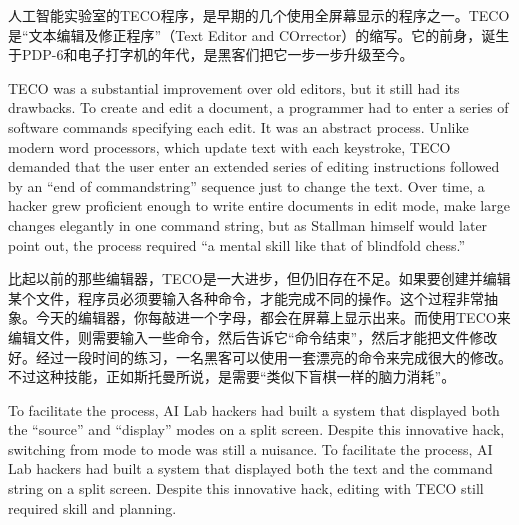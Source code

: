 \ifdefined\chs
人工智能实验室的TECO程序，是早期的几个使用全屏幕显示的程序之一。TECO是``文本编辑及修正程序''（Text Editor and COrrector）的缩写。它的前身，诞生于PDP-6和电子打字机的年代，是黑客们把它一步一步升级至今。
\fi

\ifdefined\eng
TECO was a substantial improvement over old editors, but it still had its drawbacks. To create and edit a document, a programmer had to enter a series of \ifdefined\vone software \fi commands specifying each edit. It was an abstract process. Unlike modern word processors, which update text with each keystroke, TECO demanded that the user enter an extended series of editing instructions followed by an ``end of command\ifdefined\vtwo string\fi'' sequence just to change the text. Over time, a hacker grew proficient enough to \ifdefined\vone write entire documents in edit mode, \fi\ifdefined\vtwo make large changes elegantly in one command string, \fi but as Stallman himself would later point out, the process required ``a mental skill like that of blindfold chess.''
\fi

\ifdefined\chs
比起以前的那些编辑器，TECO是一大进步，但仍旧存在不足。如果要创建并编辑某个文件，程序员必须要输入各种命令，才能完成不同的操作。这个过程非常抽象。今天的编辑器，你每敲进一个字母，都会在屏幕上显示出来。而使用TECO来编辑文件，则需要输入一些命令，然后告诉它``命令结束''，然后才能把文件修改好。经过一段时间的练习，一名黑客可以使用一套漂亮的命令来完成很大的修改。不过这种技能，正如斯托曼所说，是需要``类似下盲棋一样的脑力消耗''。
\fi

\ifdefined\eng
\ifdefined\vone
To facilitate the process, AI Lab hackers had built a system that displayed both the ``source'' and ``display'' modes on a split screen. Despite this innovative hack, switching from mode to mode was still a nuisance.
\fi
\ifdefined\vtwo
To facilitate the process, AI Lab hackers had built a system that displayed both the text and the command string on a split screen. Despite this innovative hack, editing with TECO still required skill and planning.
\fi
\fi

